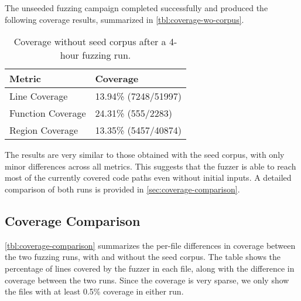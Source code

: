 \documentclass[11pt,a4paper,twocolumn]{article}
\begin{document}
The unseeded fuzzing campaign completed successfully and produced the following coverage results, summarized in \autoref{tbl:coverage-wo-corpus}.

\begin{table}[ht]
	\centering
	\begin{tabular}{@{}ll@{}}
		\toprule
		\textbf{Metric}   & \textbf{Coverage}    \\
		\midrule
		Line Coverage     & 13.94\% (7248/51997) \\
		Function Coverage & 24.31\% (555/2283)   \\
		Region Coverage   & 13.35\% (5457/40874) \\
		\bottomrule
	\end{tabular}
	\caption{Coverage without seed corpus after a 4-hour fuzzing run.}
	\label{tbl:coverage-wo-corpus}
\end{table}

The results are very similar to those obtained with the seed corpus, with only minor differences across all metrics. This suggests that the fuzzer is able to reach most of the currently covered code paths even without initial inputs. A detailed comparison of both runs is provided in \autoref{sec:coverage-comparison}.

\subsection*{Coverage Comparison}
\label{sec:coverage-comparison}

\autoref{tbl:coverage-comparison} summarizes the per-file differences in coverage between the two fuzzing runs, with and without the seed corpus. The table shows the percentage of lines covered by the fuzzer in each file, along with the difference in coverage between the two runs. Since the coverage is very sparse, we only show the files with at least 0.5\% coverage in either run.
\end{document}
